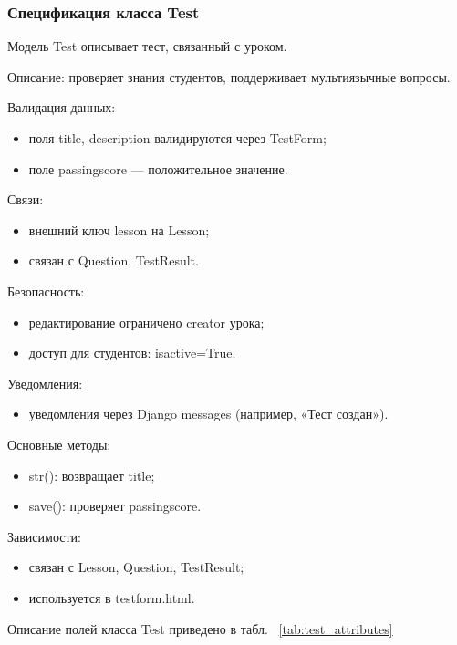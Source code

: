 \subsubsection{Спецификация класса Test}

Модель Test описывает тест, связанный с уроком.

Описание: проверяет знания студентов, поддерживает мультиязычные вопросы.

Валидация данных:
	\begin{itemize}
		\item поля title, description валидируются через TestForm;
		\item поле passingscore — положительное значение.
	\end{itemize}
	
Связи:
	\begin{itemize}
		\item внешний ключ lesson на Lesson;
		\item связан с Question, TestResult.
	\end{itemize}
	
Безопасность:
	\begin{itemize}
		\item редактирование ограничено creator урока;
		\item доступ для студентов: isactive=True.
	\end{itemize}
	
Уведомления:
	\begin{itemize}
		\item уведомления через Django messages (например, «Тест создан»).
	\end{itemize}
	
Основные методы:
	\begin{itemize}
		\item str(): возвращает title;
		\item save(): проверяет passingscore.
	\end{itemize}
	
Зависимости:
	\begin{itemize}
		\item связан с Lesson, Question, TestResult;
		\item используется в testform.html.
	\end{itemize}

Описание полей класса Test приведено в табл. ~\ref {tab:test_attributes}

